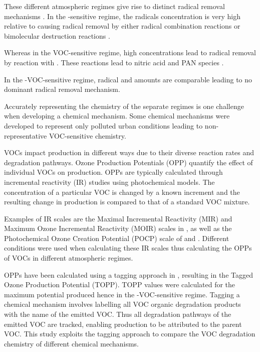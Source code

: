 These different atmospheric regimes give rise to distinct radical removal mechanisms \citep{Kleinman:1991}. 
In the -sensitive regime, the radicals concentration is very high relative to  causing radical removal by either radical combination reactions  or bimolecular destruction reactions  \citep{Kleinman:1994}.
\begin{reactionlist}
\end{reactionlist}
Whereas in the VOC-sensitive regime, high  concentrations lead to radical removal by reaction with . 
These reactions lead to nitric acid  and PAN species .
\begin{reactionlist}
\end{reactionlist}
In the -VOC-sensitive regime, radical and  amounts are comparable leading to no dominant radical removal mechanism. 

Accurately representing the chemistry of the separate regimes is one challenge when developing a chemical mechanism.
Some chemical mechanisms were developed to represent only polluted urban conditions leading to non-representative VOC-sensitive chemistry.

VOCs impact  production in different ways due to their diverse reaction rates and degradation pathways. 
Ozone Production Potentials (OPP) quantify the effect of individual VOCs on  production. 
OPPs are typically calculated through incremental reactivity (IR) studies using photochemical models. 
The concentration of a particular VOC is changed by a known increment and the resulting change in  production is compared to that of a standard VOC mixture. 

Examples of IR scales are the Maximal Incremental Reactivity (MIR) and Maximum Ozone Incremental Reactivity (MOIR) scales in \citet{Carter:1994}, as well as the Photochemical Ozone Creation Potential (POCP) scale of \citet{Derwent:1996} and \citet{Derwent:1998}. 
Different  conditions were used when calculating these IR scales thus calculating the OPPs of VOCs in different atmospheric regimes.

OPPs have been calculated using a tagging approach in \citet{Butler:2011}, resulting in the Tagged Ozone Production Potential (TOPP). 
TOPP values were calculated for the maximum potential  produced hence in the -VOC-sensitive regime.
Tagging a chemical mechanism involves labelling all VOC organic degradation products with the name of the emitted VOC.
Thus all degradation pathways of the emitted VOC are tracked, enabling  production to be attributed to the parent VOC.
This study exploits the tagging approach to compare the VOC degradation chemistry of different chemical mechanisms. 

